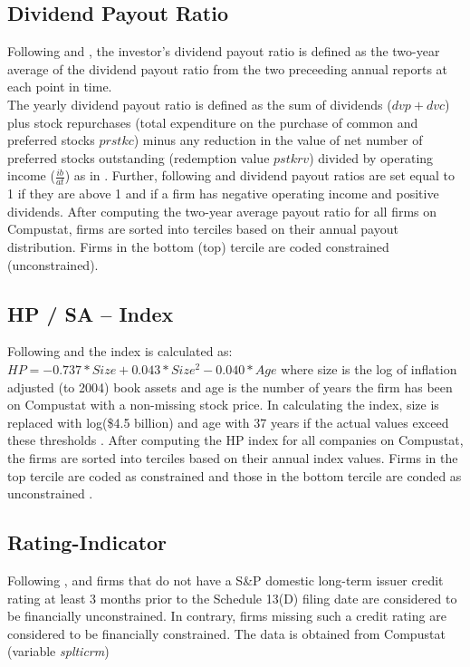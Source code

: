 \documentclass[12pt]{article}
\begin{document}
\begin{appendices}
	\subsection*{Dividend Payout Ratio}
	\noindent Following \citet[p.119]{Khatami2014} and \citet[p.1789]{Almeida2004}, the investor's dividend payout ratio is defined as the two-year average of the dividend payout ratio from the two preceeding annual reports at each point in time.\\
	The yearly dividend payout ratio is defined as the sum of dividends ($dvp+dvc$) plus stock repurchases (total expenditure on the purchase of common and preferred stocks $prstkc$) minus any reduction in the value of net number of preferred stocks outstanding (redemption value $pstkrv$) divided by operating income ($\frac{ib}{at}$) as in \citet[p.369]{Jagannathan2000}. Further, following \citet[p.119]{Khatami2014} and \citet[p.1923]{hadlock2010} dividend payout ratios are set equal to 1 if they are above 1 and if a firm has negative operating income and positive dividends. After computing the two-year average payout ratio for all firms on Compustat, firms are sorted into terciles based on their annual payout distribution. Firms in the bottom (top) tercile are coded constrained (unconstrained). 

	\subsection*{HP / SA -- Index}
	\noindent Following \citet[p.1929]{hadlock2010} and \citet[p.119]{Khatami2014} the index is calculated as: $HP=-0.737*Size+0.043*Size^{2}-0.040*Age$ where size is the log of inflation adjusted (to 2004) book assets and age is the number of years the firm has been on Compustat with a non-missing stock price. In calculating the index, size is replaced with log(\$4.5 billion) and age with 37 years if the actual values exceed these thresholds \citep[p.1929]{hadlock2010}. After computing the HP index for all companies on Compustat, the firms are sorted into terciles based on their annual index values. Firms in the top tercile are coded as constrained and those in the bottom tercile are conded as unconstrained \citep[p.306]{Farre-Mensa2016}.

	\subsection*{Rating-Indicator}
	\noindent Following \citet[p.18]{heller2015}, \citet[p.1790]{Almeida2004} and \citet[p.305]{Farre-Mensa2016} firms that do not have a S\&P domestic long-term issuer credit rating at least 3 months prior to the Schedule 13(D) filing date are considered to be financially unconstrained. In contrary, firms missing such a credit rating are considered to be financially constrained. The data is obtained from Compustat (variable \emph{splticrm})

\end{appendices}
\end{document}
